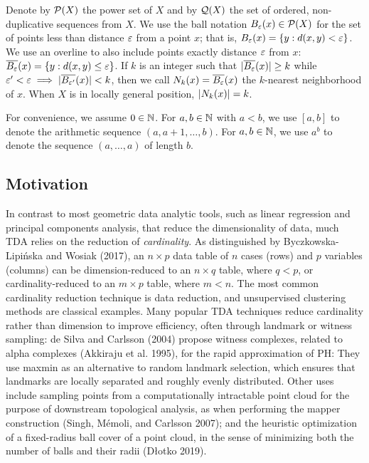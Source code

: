\documentclass{article}
\begin{document}
Denote by \(\mathcal{P}(X)\) the power set of \(X\) and by \(\mathcal{Q}(X)\) the
set of ordered, non-duplicative sequences from \(X\). We use the ball
notation \(B_{\varepsilon}(x) \in \mathcal{P}(X)\) for the set of points less than
distance \(\varepsilon\) from a point \(x\); that is,
\(B_{\varepsilon}(x) = \{ y : d(x,y) < \varepsilon \}\). We use an overline to
also include points exactly distance \(\varepsilon\) from \(x\):
\(\overline{B_{\varepsilon}}(x) = \{ y : d(x,y) \leq \varepsilon \}\). If \(k\) is an
integer such that \(\lvert \overline{B_\varepsilon}(x)\rvert \geq k\) while
\(\varepsilon'<\varepsilon \implies \lvert \overline{B_{\varepsilon'}}(x)\rvert < k\), then we call
\(N_k(x) = \overline{B_\varepsilon}(x)\) the \(k\)-nearest neighborhood of \(x\).
When \(X\) is in locally general position, \(\lvert N_k(x)\rvert = k\).

For convenience, we assume \(0\in\mathbb{N}\). For \(a,b \in \mathbb{N}\) with \(a<b\),
we use \([a,b]\) to denote the arithmetic sequence \((a,a+1,\ldots,b)\).
For \(a,b \in \mathbb{N}\), we use \(a^b\) to denote the sequence
\((a,\ldots,a)\) of length \(b\).

\hypertarget{motivation}{%
\subsection{Motivation}\label{motivation}}

In contrast to most geometric data analytic tools, such as linear
regression and principal components analysis, that reduce the
dimensionality of data, much TDA relies on the reduction of
\emph{cardinality}. As distinguished by Byczkowska-Lipińska and Wosiak
(2017), an \(n\times p\) data table of \(n\) cases (rows) and \(p\)
variables (columns) can be dimension-reduced to an \(n\times q\) table,
where \(q<p\), or cardinality-reduced to an \(m\times p\) table, where
\(m<n\). The most common cardinality reduction technique is data
reduction, and unsupervised clustering methods are classical examples.
Many popular TDA techniques reduce cardinality rather than dimension to
improve efficiency, often through landmark or witness sampling: de Silva
and Carlsson (2004) propose witness complexes, related to alpha
complexes (Akkiraju et al. 1995), for the rapid approximation of PH:
They use maxmin as an alternative to random landmark selection, which
ensures that landmarks are locally separated and roughly evenly
distributed. Other uses include sampling points from a computationally
intractable point cloud for the purpose of downstream topological
analysis, as when performing the mapper construction (Singh, Mémoli, and
Carlsson 2007); and the heuristic optimization of a fixed-radius ball
cover of a point cloud, in the sense of minimizing both the number of
balls and their radii (Dłotko 2019).
\end{document}
